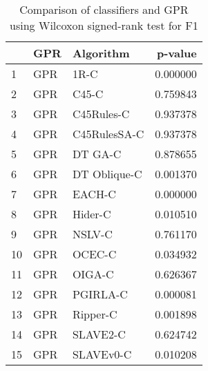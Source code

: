 \begin{table}
\footnotesize
\caption{Comparison of classifiers and GPR using Wilcoxon signed-rank test for F1}
\label{tab:GPR wilcoxon F1 comparison}
\begin{tabular}{lllr}
\hline
 & GPR & Algorithm & p-value \\
\hline
1 & GPR & 1R-C & 0.000000 \\
2 & GPR & C45-C & 0.759843 \\
3 & GPR & C45Rules-C & 0.937378 \\
4 & GPR & C45RulesSA-C & 0.937378 \\
5 & GPR & DT GA-C & 0.878655 \\
6 & GPR & DT Oblique-C & 0.001370 \\
7 & GPR & EACH-C & 0.000000 \\
8 & GPR & Hider-C & 0.010510 \\
9 & GPR & NSLV-C & 0.761170 \\
10 & GPR & OCEC-C & 0.034932 \\
11 & GPR & OIGA-C & 0.626367 \\
12 & GPR & PGIRLA-C & 0.000081 \\
13 & GPR & Ripper-C & 0.001898 \\
14 & GPR & SLAVE2-C & 0.624742 \\
15 & GPR & SLAVEv0-C & 0.010208 \\
\hline
\end{tabular}
\end{table}
